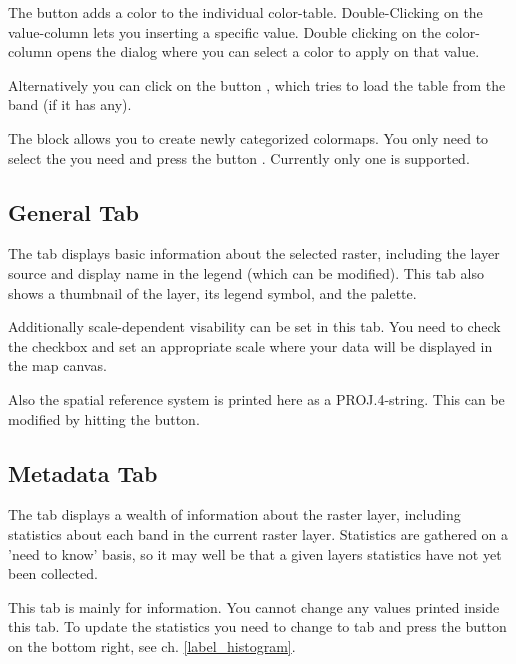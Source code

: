 The button  adds a color to the individual color-table.
Double-Clicking on the value-column lets you inserting a specific value.
Double clicking on the color-column opens the dialog  where you can select a color to apply on that value.

Alternatively you can click on the button
, which tries to
load the table from the band (if it has any).

The block  allows you to create newly
categorized colormaps. You only need to select the  you need and press the button . Currently
only one  is
supported.

\subsection{General Tab}\label{label_generaltab}

The  tab displays basic information about the selected raster,
including the layer source and  display name in the legend (which can be
modified). This tab also shows a thumbnail of the layer, its legend symbol,
and the palette.

Additionally scale-dependent visability can be set in this tab. You need to
check the checkbox and set an appropriate scale where your data will be
displayed in the map canvas.

Also the spatial reference system is printed here as a PROJ.4-string.
This can be modified by hitting the  button.

\subsection{Metadata Tab}\label{label_metatab}

The  tab displays a wealth of information about the raster layer,
including statistics about each band in the current raster layer. Statistics
are gathered on a 'need to know' basis, so it may well be that a given layers
statistics have not yet been collected.

This tab is mainly for information. You cannot change any values printed
inside this tab. To update the statistics you need to change to tab
 and press the button  on the bottom right,
see ch. \ref{label_histogram}.

